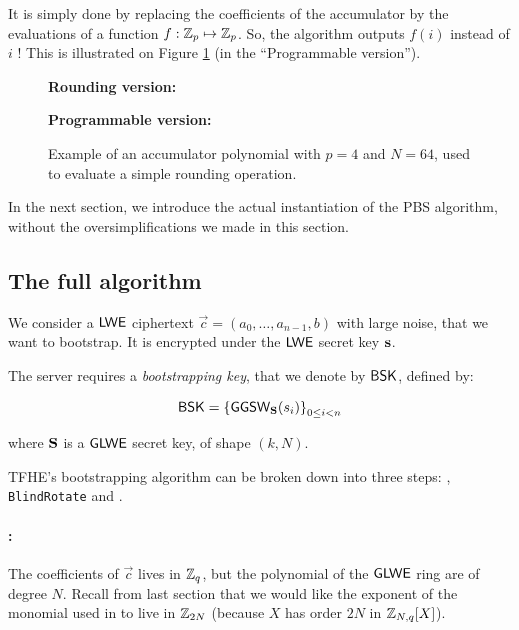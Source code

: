 It is simply done by replacing the coefficients of the accumulator by the evaluations of a function $f:\mathbb{Z}_p \mapsto \mathbb{Z}_p$. So, the algorithm outputs $f(i)$ instead of $i$ ! This is illustrated on Figure \ref{fig:illustration_accumulator} (in the ``Programmable version'').


\begin{figure}
	\centering
	
	
	\vspace{1.5em}
	
	\textbf{Rounding version:}\\[0.5em]
	
	\vspace{1.5em}
	
	\textbf{Programmable version:}\\[0.5em]
	
	\caption{Example of an accumulator polynomial with $p=4$ and $N=64$, used to evaluate a simple rounding operation.}
	\label{fig:illustration_accumulator}
\end{figure}

\bigskip

In the next section, we introduce the actual instantiation of the PBS algorithm, without the oversimplifications we made in this section.

\subsection{The full algorithm}
\label{sec:pbs_algorithm}

We consider a $\textsf{LWE}$ ciphertext $\vec c = (a_0, \dots, a_{n-1}, b)$ with large noise, that we want to bootstrap. It is encrypted under the $\textsf{LWE}$ secret key $\mathbf s$. 

The server requires a \textit{bootstrapping key}, that we denote by $\textsf{BSK}$, defined by:

\[
	\textsf{BSK} = \left \lbrace \textsf{GGSW}_{\mathbf S}(s_i) \right \rbrace_{0 \le i < n}
\]

where $\mathbf S$ is a $\textsf{GLWE}$ secret key, of shape $(k, N)$.

\bigskip
TFHE's bootstrapping algorithm can be broken down into three steps: \ModSwitch, \texttt{BlindRota\-te} and \SampleExtract.

\paragraph{\ModSwitch:} The coefficients of $\vec c$ lives in $\mathbb{Z}_q$, but the polynomial of the $\textsf{GLWE}$ ring are of degree $N$. Recall from last section that we would like the exponent of the monomial used in \BlindRotate to live in $\mathbb{Z}_{2N}$ (because $X$ has order $2N$ in $\mathbb{Z}_{N,q}[X]$).

